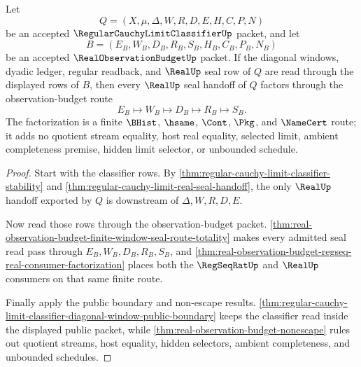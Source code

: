 \begin{theorem}
\label{thm:regular-cauchy-limit-classifier-observation-budget-factorization}
Let
$$
Q=(X,\mu,\Delta,W,R,D,E,H,C,P,N)
$$
be an accepted $\RegularCauchyLimitClassifierUp$ packet, and let
$$
B=(E_B,W_B,D_B,R_B,S_B,H_B,C_B,P_B,N_B)
$$
be an accepted $\RealObservationBudgetUp$ packet. If the diagonal windows, dyadic ledger, regular readback, and $\RealUp$ seal row of $Q$ are read through the displayed rows of $B$, then every $\RealUp$ seal handoff of $Q$ factors through the observation-budget route
$$
E_B \longmapsto W_B \longmapsto D_B \longmapsto R_B \longmapsto S_B.
$$
The factorization is a finite $\BHist$, $\hsame$, $\Cont$, $\Pkg$, and $\NameCert$ route; it adds no quotient stream equality, host real equality, selected limit, ambient completeness premise, hidden limit selector, or unbounded schedule.
\end{theorem}
\begin{proof}
Start with the classifier rows. By \autoref{thm:regular-cauchy-limit-classifier-stability} and \autoref{thm:regular-cauchy-limit-real-seal-handoff}, the only $\RealUp$ handoff exported by $Q$ is downstream of $\Delta,W,R,D,E$.

Now read those rows through the observation-budget packet. \autoref{thm:real-observation-budget-finite-window-seal-route-totality} makes every admitted seal read pass through $E_B,W_B,D_B,R_B,S_B$, and \autoref{thm:real-observation-budget-regseq-real-consumer-factorization} places both the $\RegSeqRatUp$ and $\RealUp$ consumers on that same finite route.

Finally apply the public boundary and non-escape results. \autoref{thm:regular-cauchy-limit-classifier-diagonal-window-public-boundary} keeps the classifier read inside the displayed public packet, while \autoref{thm:real-observation-budget-nonescape} rules out quotient streams, host equality, hidden selectors, ambient completeness, and unbounded schedules.
\end{proof}


